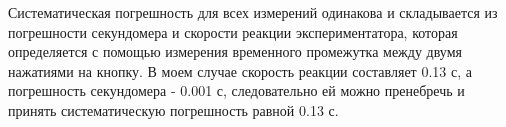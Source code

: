 \documentclass[a4paper,12pt]{article}
\begin{document}
\begin{itemize}
        Систематическая погрешность для всех измерений одинакова и складывается из погрешности секундомера и скорости
        реакции экспериментатора, которая определяется с помощью измерения временного промежутка между двумя нажатиями
        на кнопку. В моем случае скорость реакции составляет 0.13 с, а погрешность секундомера - 0.001 с, следовательно
        ей можно пренебречь и принять систематическую погрешность равной 0.13 с.


    \end{itemize}
\end{document}
